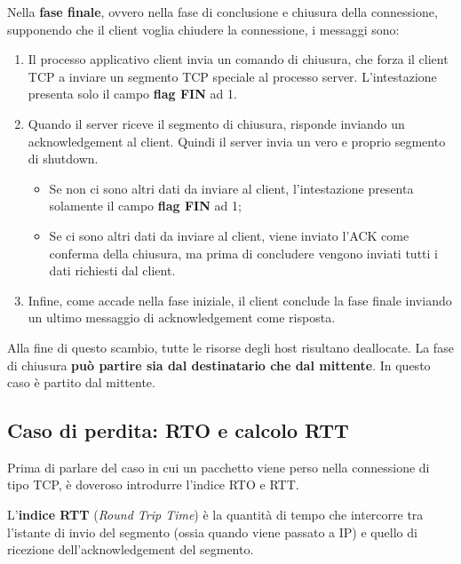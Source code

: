 \documentclass[a4paper]{article}
\begin{document}
	\newpage
	
	\noindent
	Nella \textcolor{Red3}{\textbf{fase finale}}, ovvero nella fase di conclusione e chiusura della connessione, supponendo che il client voglia chiudere la connessione, i messaggi sono:
	\begin{enumerate}
		\item Il processo applicativo client invia un comando di chiusura, che forza il client TCP a inviare un segmento TCP speciale al processo server.\newline
		L’intestazione presenta solo il campo \textbf{flag FIN} ad 1.
		
		\item Quando il server riceve il segmento di chiusura, risponde inviando un acknowledgement al client. Quindi il server invia un vero e proprio segmento di shutdown.
		\begin{itemize}
			\item Se non ci sono altri dati da inviare al client, l'intestazione presenta solamente il campo \textbf{flag FIN} ad 1;
			\item Se ci sono altri dati da inviare al client, viene inviato l'ACK come conferma della chiusura, ma prima di concludere vengono inviati tutti i dati richiesti dal client.
		\end{itemize}
		
		\item Infine, come accade nella fase iniziale, il client conclude la fase finale inviando un ultimo messaggio di acknowledgement come risposta.
	\end{enumerate}
	Alla fine di questo scambio, tutte le risorse degli host risultano deallocate. La fase di chiusura \textbf{può partire sia dal destinatario che dal mittente}. In questo caso è partito dal mittente.
	
	\newpage
	
	\subsection{Caso di perdita: RTO e calcolo RTT}
	
	Prima di parlare del caso in cui un pacchetto viene perso nella connessione di tipo TCP, è doveroso introdurre l’indice RTO e RTT.\newline
	
	\noindent
	L’\textcolor{Red3}{\textbf{indice RTT}} (\emph{Round Trip Time}) è la quantità di tempo che intercorre tra l’istante di invio del segmento (ossia quando viene passato a IP) e quello di ricezione dell’acknowledgement del segmento.\newline
	
\end{document}
